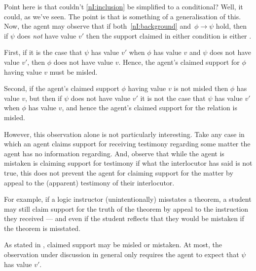 \begin{note}
  {
    \color{red}
    Point here is that couldn't \ref{nI:inclusion} be simplified to a conditional?
    Well, it could, as we've seen.
    The point is that \nI{} is something of a generalisation of this.
  }
  Now, the agent may observe that if both~\ref{nI:background} and~\(\phi \rightarrow \psi\) hold, then if \(\psi\) does \emph{not} have value \(v'\) then the support claimed in either condition is either \mom{}.

  First, if it is the case that \(\psi\) has value \(v'\) when \(\phi\) has value \(v\) and \(\psi\) does not have value \(v'\), then \(\phi\) does not have value \(v\).
  Hence, the agent's claimed support for \(\phi\) having value \(v\) must be misled.

  Second, if the agent's claimed support \(\phi\) having value \(v\) is not misled then \(\phi\) has value \(v\), but then if \(\psi\) does not have value \(v'\) it is not the case that \(\psi\) has value \(v'\) when \(\phi\) has value \(v\), and hence the agent's claimed support for the relation is misled.

  However, this observation alone is not particularly interesting.
  Take any case in which an agent claims support for receiving testimony regarding some matter the agent has no information regarding.
  And, observe that while the agent is mistaken is claiming support for testimony if what the interlocutor has said is not true, this does not prevent the agent for claiming support for the matter by appeal to the (apparent) testimony of their interlocutor.

  For example, if a logic instructor (unintentionally) misstates a theorem, a student may still claim support for the truth of the theorem by appeal to the instruction they received --- and even if the student reflects that they would be mistaken if the theorem is misstated.

  As stated in \eiS{}, claimed support may be misled or mistaken.
  At most, the observation under discussion in general only requires the agent to expect that \(\psi\) has value \(v'\).

\end{note}


